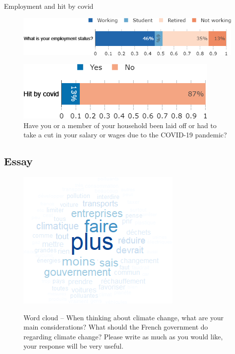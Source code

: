 \begin{framefont}{\small}
\begin{frame}{Employment and hit by covid}%
\begin{figure}[h!]
\centering
\captionsetup{justification=centering}
\caption{What is your employment status?}
\includegraphics[width=.7\paperwidth]{../figures/FR/employment_status_FR.png} \\
\vspace{.5cm}
\caption{Have you or a member of your household been laid off or had to take a cut in your salary or wages due to the COVID-19 pandemic?}
\includegraphics[width=.48\paperwidth]{../figures/FR/hit_by_covid_FR.png}
\end{figure}
\end{frame}

 \subsection{Essay}


 \begin{frame}{}%
 \begin{figure}[h!]
 \centering
 \caption{Word cloud -- When thinking about climate change, what are your main considerations? What should the French government do regarding climate change?
 Please write as much as you would like, your response will be very useful.}
 \includegraphics[width=.43\paperwidth]{../figures/FR/CC_field_FR.png} \\
 \end{figure}
 \end{frame}


\end{framefont}
